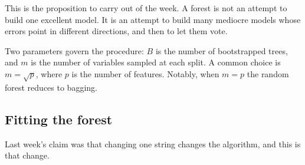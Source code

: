 \documentclass[
  a4paper,
]{scrbook}
\newenvironment{Shaded}{\begin{snugshade}}{\end{snugshade}}
\newcommand{\AttributeTok}[1]{\textcolor[rgb]{0.40,0.45,0.13}{#1}}
\newcommand{\DecValTok}[1]{\textcolor[rgb]{0.68,0.00,0.00}{#1}}
\newcommand{\FunctionTok}[1]{\textcolor[rgb]{0.28,0.35,0.67}{#1}}
\newcommand{\NormalTok}[1]{\textcolor[rgb]{0.00,0.23,0.31}{#1}}
\newcommand{\OtherTok}[1]{\textcolor[rgb]{0.00,0.23,0.31}{#1}}
\newcommand{\SpecialCharTok}[1]{\textcolor[rgb]{0.37,0.37,0.37}{#1}}
\newcommand{\StringTok}[1]{\textcolor[rgb]{0.13,0.47,0.30}{#1}}
\begin{document}
This is the proposition to carry out of the week. A forest is not an
attempt to build one excellent model. It is an attempt to build many
mediocre models whose errors point in different directions, and then to
let them vote.

Two parameters govern the procedure: \(B\) is the number of bootstrapped
trees, and \(m\) is the number of variables sampled at each split. A
common choice is \(m = \sqrt{p}\), where \(p\) is the number of
features. Notably, when \(m = p\) the random forest reduces to bagging.

\subsection{Fitting the forest}\label{fitting-the-forest}

Last week's claim was that changing one string changes the algorithm,
and this is that change.

\begin{Shaded}
\end{Shaded}
\end{document}
